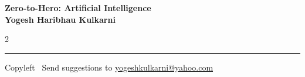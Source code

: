 \documentclass[8pt,landscape]{article}
\begin{document}
\footnotesize


\begin{center}
\Large{\textbf{Zero-to-Hero: Artificial Intelligence\\ Yogesh Haribhau Kulkarni}}
\end{center}

\begin{multicols}{2}

\end{multicols}

\rule{\linewidth}{0.25pt}
\scriptsize
Copyleft \textcopyleft\  Send suggestions to
\href{http://www.yogeshkulkarni.com}{yogeshkulkarni@yahoo.com}
\end{document}
